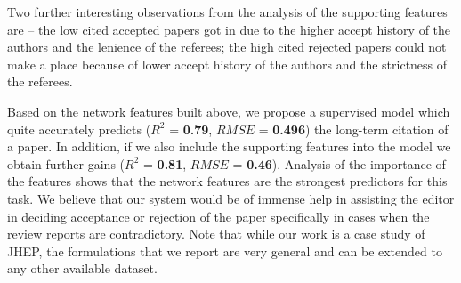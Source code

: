 Two further interesting observations from the analysis of the supporting features are -- the low cited accepted papers got in due to the higher accept history of the authors and the lenience of the referees; the high cited rejected papers could not make a place because of lower accept history of the authors and the strictness of the referees.

Based on the network features built above, we propose a supervised model which quite accurately predicts ($R^2$ = {\bf 0.79}, $RMSE$ = {\bf 0.496}) the long-term citation of a paper. In addition, if we also include the supporting features into the model we obtain further gains ($R^2$ = {\bf 0.81}, $RMSE$ = {\bf 0.46}). Analysis of the importance of the features shows that the network features are the strongest predictors for this task.
We believe that our system would be of immense help in assisting the editor in deciding acceptance or rejection of the paper specifically in cases when the review reports are contradictory. 
Note that while our work is a case study of JHEP, the formulations that we report are very general and can be extended to any other available dataset. 

\medskip